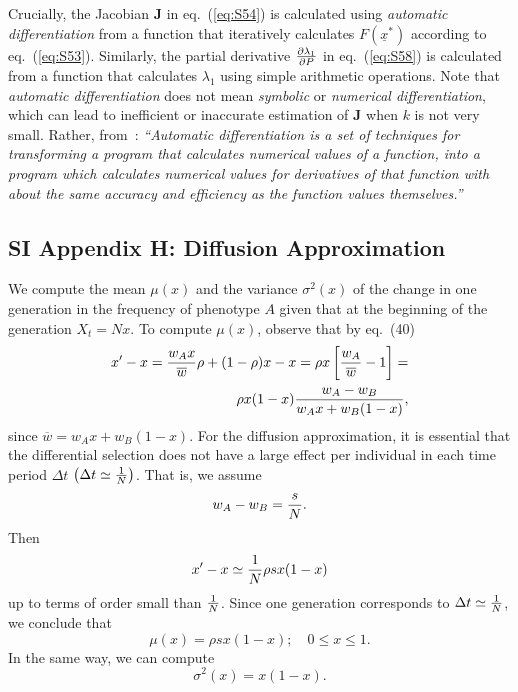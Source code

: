 \documentclass[9pt, a4paper]{extarticle}
\newcommand{\cj}{\mathbf{J}}
\begin{document}
Crucially, the Jacobian $\cj$ in eq.~(\ref{eq:S54}) is calculated using {\sl automatic differentiation} from a function that iteratively calculates $F(\underline x^*)$ according to eq.~(\ref{eq:S53}). Similarly, the partial derivative ${\partial \lambda_1 \over \partial P}$ in eq.~(\ref{eq:S58}) is calculated from a function that calculates $\lambda_1$ using simple arithmetic operations.
Note that {\sl automatic differentiation} does not mean {\sl symbolic} or {\sl numerical differentiation}, which can lead to inefficient or inaccurate estimation of $\cj$ when $k$ is not very small. Rather, from~\citet{bartholomew2000}: 
{\sl ``Automatic differentiation is a set of techniques for transforming a program that calculates numerical values of a function, into a program which calculates numerical values for derivatives of that function with about the same accuracy and efficiency as the function values themselves.''}

\subsection*{SI Appendix H: Diffusion Approximation}

We compute the mean $\mu(x)$ and the variance $\sigma^2(x)$ of the change in one generation  in the frequency of phenotype $A$ given that at the beginning of the generation $X_t=Nx$.
To compute $\mu(x)$, observe that by eq.~(40)
 \begin{equation}
 \begin{aligned}
 x' -x =
 {w_Ax\over\overline w}\rho +(1-\rho)x -x =
 \rho x\left[{w_A\over \overline w}-1\right] = \\
 \rho x(1-x){w_A -w_B\over w_Ax +w_B(1-x)},
 \label{49}\end{aligned}\end{equation}
 since $\overline w =w_A x +w_B(1-x)$.
 For the diffusion approximation, it is essential that the differential selection does not have a large effect per individual in each time period  $\Delta t$ $\bigl(\Delta t\simeq{1\over N}\bigr)$. That is, we assume
 \begin{equation}
 w_A -w_B ={s\over N}.
 \label{50}\end{equation}
 Then
 \begin{equation}
 x'-x\simeq {1\over N}\rho sx(1-x)
 \label{51}\end{equation}
 up to terms of order small than ${1\over N}$. Since one generation corresponds to $\Delta t\simeq {1\over N}$, we  conclude that
 \begin{equation}
 \mu(x) =\rho sx(1-x);\quad 0\le x\le 1.
 \label{52}\end{equation}
 In the same way, we can compute 
  \begin{equation}
  \sigma^2(x) = x(1-x).
 \end{equation}
\end{document}
